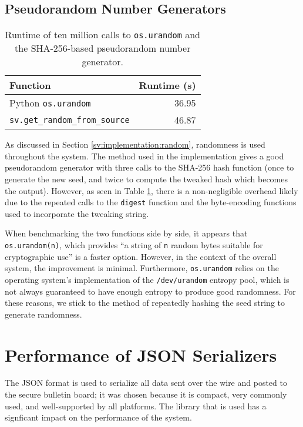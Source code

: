 \subsection{Pseudorandom Number Generators} \label{perf:crypto:random}

\begin{table}[htbp]
\centering
\begin{tabular}{l | r}
  \textbf{Function} & \textbf{Runtime (s)} \\
  \hline
  Python \texttt{os.urandom} & 36.95 \\
  \texttt{sv.get\_random\_from\_source} & 46.87
\end{tabular}
\caption[Performance measurements of pseudorandom number generators]{Runtime of ten million calls to \texttt{os.urandom} and the SHA-256-based pseudorandom number generator.}
\label{table:perf:rand}
\end{table}

As discussed in Section \ref{sv:implementation:random}, randomness is used throughout the system. The method used in the implementation gives a good pseudorandom generator with three calls to the SHA-256 hash function (once to generate the new seed, and twice to compute the tweaked hash which becomes the output). However, as seen in Table \ref{table:perf:rand}, there is a non-negligible overhead likely due to the repeated calls to the \texttt{digest} function and the byte-encoding functions used to incorporate the tweaking string.

When benchmarking the two functions side by side, it appears that \texttt{os.urandom(n)}, which provides ``a string of \texttt{n} random bytes suitable for cryptographic use'' \cite{python-urandom} is a faster option. However, in the context of the overall system, the improvement is minimal. Furthermore, \texttt{os.urandom} relies on the operating system's implementation of the \texttt{/dev/urandom} entropy pool, which is not always guaranteed to have enough entropy to produce good randomness. For these reasons, we stick to the method of repeatedly hashing the seed string to generate randomness.

\section{Performance of JSON Serializers} \label{perf:json}

The JSON format is used to serialize all data sent over the wire and posted to the secure bulletin board; it was chosen because it is compact, very commonly used, and well-supported by all platforms. The library that is used has a signficant impact on the performance of the system.

